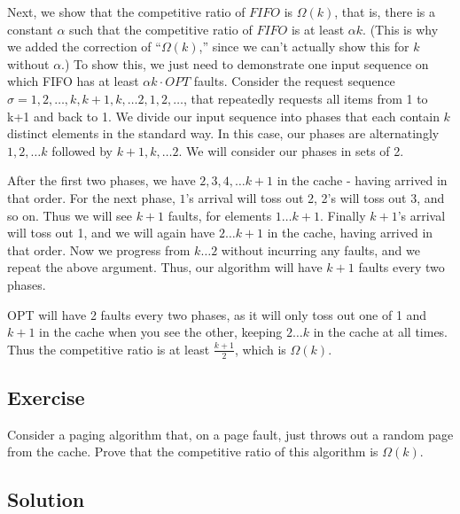 \documentclass{article}
\newcounter{counter}
\newcommand{\Exercise}{Exercise \stepcounter{counter}\thecounter}
\begin{document}
    \vspace{3mm}
    Next, we show that the competitive ratio of $FIFO$ is $\Omega(k)$, that is, there is a constant $\alpha$ such that the competitive ratio of $FIFO$ is at least $\alpha k$. (This is why we added the correction of ``$\Omega(k)$,'' since we can't actually show this for $k$ without $\alpha$.) To show this, we just need to demonstrate one input sequence on which FIFO has at least $\alpha k \cdot OPT$ faults. Consider the request sequence $\sigma = 1,2,\ldots,k,k+1,k,\ldots 2,1,2, \ldots$, that repeatedly requests all items from 1 to k+1 and back to 1. We divide our input sequence into phases that each contain $k$ distinct elements in the standard way. In this case, our phases are alternatingly $1,2,\ldots k$ followed by $k+1,k,\ldots 2$. We will consider our phases in sets of 2.

    \vspace{5mm}
    After the first two phases, we have $2,3,4,\ldots k+1$ in the cache - having arrived in that order. For the next phase, $1$'s arrival will toss out 2, 2's will toss out 3, and so on. Thus we will see $k+1$ faults, for elements $1 \ldots k+1$. Finally $k+1$'s arrival will toss out 1, and we will again have $2 \ldots k+1$ in the cache, having arrived in that order. Now we progress from $k \ldots 2$ without incurring any faults, and we repeat the above argument. Thus, our algorithm will have $k + 1$ faults every two phases.

    \vspace{5mm} OPT will have 2 faults every two phases, as it will only toss out one of 1 and $k+1$ in the cache when you see the other, keeping $2 \ldots k$ in the cache at all times. Thus the competitive ratio is at least $\frac{k+1}{2}$, which is $\Omega(k)$.

\subsection*{\Exercise}
    Consider a paging algorithm that, on a page fault, just throws out a random page from the cache. Prove that the competitive ratio of this algorithm is $\Omega(k)$.

\subsection*{Solution}

\end{document}
